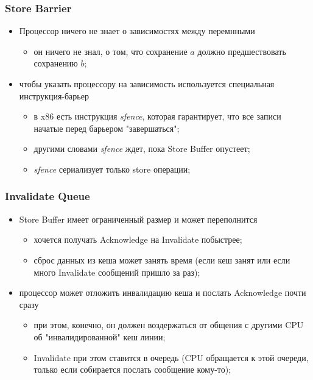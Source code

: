 \begin{frame}
\frametitle{Store Barrier}

\begin{itemize}
  \item Процессор ничего не знает о зависимостях между перемнными
        \begin{itemize}
          \item он ничего не знал, о том, что сохранение $a$ должно
                предшествовать сохранению $b$;
        \end{itemize}
  \item чтобы указать процессору на зависимость используется специальная
        инструкция-барьер
        \begin{itemize}
          \item в x86 есть инструкция \emph{sfence}, которая гарантирует, что
                все записи начатые перед барьером "завершаться";
          \item другими словами \emph{sfence} ждет, пока Store Buffer опустеет;
          \item \emph{sfence} сериализует только store операции;
        \end{itemize}
\end{itemize}
\end{frame}

\begin{frame}
\frametitle{Invalidate Queue}

\begin{itemize}
  \item Store Buffer имеет ограниченный размер и может переполнится
        \begin{itemize}
          \item хочется получать Acknowledge на Invalidate побыстрее;
          \item сброс данных из кеша может занять время (если кеш занят или если
                много Invalidate сообщений пришло за раз);
        \end{itemize}
  \item процессор может отложить инвалидацию кеша и послать Acknowledge почти
        сразу
        \begin{itemize}
          \item при этом, конечно, он должен воздержаться от общения с другими
                CPU об "инвалидированной" кеш линии;
          \item Invalidate при этом ставится в очередь (CPU обращается к этой
                очереди, только если собирается послать сообщение кому-то);
        \end{itemize}
\end{itemize}
\end{frame}

